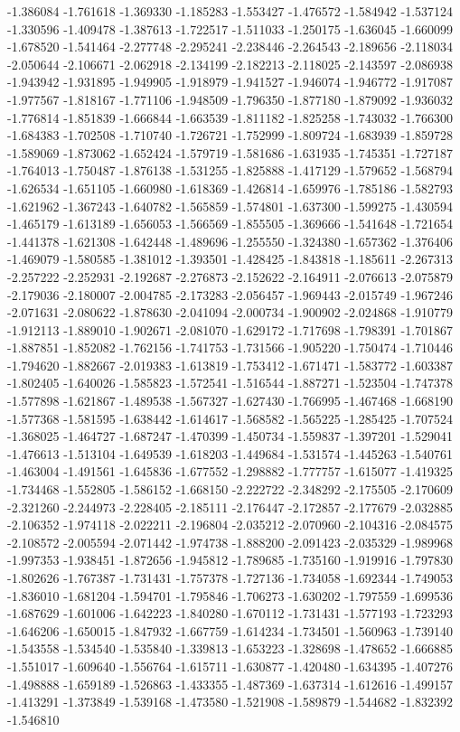 -1.386084
-1.761618
-1.369330
-1.185283
-1.553427
-1.476572
-1.584942
-1.537124
-1.330596
-1.409478
-1.387613
-1.722517
-1.511033
-1.250175
-1.636045
-1.660099
-1.678520
-1.541464
-2.277748
-2.295241
-2.238446
-2.264543
-2.189656
-2.118034
-2.050644
-2.106671
-2.062918
-2.134199
-2.182213
-2.118025
-2.143597
-2.086938
-1.943942
-1.931895
-1.949905
-1.918979
-1.941527
-1.946074
-1.946772
-1.917087
-1.977567
-1.818167
-1.771106
-1.948509
-1.796350
-1.877180
-1.879092
-1.936032
-1.776814
-1.851839
-1.666844
-1.663539
-1.811182
-1.825258
-1.743032
-1.766300
-1.684383
-1.702508
-1.710740
-1.726721
-1.752999
-1.809724
-1.683939
-1.859728
-1.589069
-1.873062
-1.652424
-1.579719
-1.581686
-1.631935
-1.745351
-1.727187
-1.764013
-1.750487
-1.876138
-1.531255
-1.825888
-1.417129
-1.579652
-1.568794
-1.626534
-1.651105
-1.660980
-1.618369
-1.426814
-1.659976
-1.785186
-1.582793
-1.621962
-1.367243
-1.640782
-1.565859
-1.574801
-1.637300
-1.599275
-1.430594
-1.465179
-1.613189
-1.656053
-1.566569
-1.855505
-1.369666
-1.541648
-1.721654
-1.441378
-1.621308
-1.642448
-1.489696
-1.255550
-1.324380
-1.657362
-1.376406
-1.469079
-1.580585
-1.381012
-1.393501
-1.428425
-1.843818
-1.185611
-2.267313
-2.257222
-2.252931
-2.192687
-2.276873
-2.152622
-2.164911
-2.076613
-2.075879
-2.179036
-2.180007
-2.004785
-2.173283
-2.056457
-1.969443
-2.015749
-1.967246
-2.071631
-2.080622
-1.878630
-2.041094
-2.000734
-1.900902
-2.024868
-1.910779
-1.912113
-1.889010
-1.902671
-2.081070
-1.629172
-1.717698
-1.798391
-1.701867
-1.887851
-1.852082
-1.762156
-1.741753
-1.731566
-1.905220
-1.750474
-1.710446
-1.794620
-1.882667
-2.019383
-1.613819
-1.753412
-1.671471
-1.583772
-1.603387
-1.802405
-1.640026
-1.585823
-1.572541
-1.516544
-1.887271
-1.523504
-1.747378
-1.577898
-1.621867
-1.489538
-1.567327
-1.627430
-1.766995
-1.467468
-1.668190
-1.577368
-1.581595
-1.638442
-1.614617
-1.568582
-1.565225
-1.285425
-1.707524
-1.368025
-1.464727
-1.687247
-1.470399
-1.450734
-1.559837
-1.397201
-1.529041
-1.476613
-1.513104
-1.649539
-1.618203
-1.449684
-1.531574
-1.445263
-1.540761
-1.463004
-1.491561
-1.645836
-1.677552
-1.298882
-1.777757
-1.615077
-1.419325
-1.734468
-1.552805
-1.586152
-1.668150
-2.222722
-2.348292
-2.175505
-2.170609
-2.321260
-2.244973
-2.228405
-2.185111
-2.176447
-2.172857
-2.177679
-2.032885
-2.106352
-1.974118
-2.022211
-2.196804
-2.035212
-2.070960
-2.104316
-2.084575
-2.108572
-2.005594
-2.071442
-1.974738
-1.888200
-2.091423
-2.035329
-1.989968
-1.997353
-1.938451
-1.872656
-1.945812
-1.789685
-1.735160
-1.919916
-1.797830
-1.802626
-1.767387
-1.731431
-1.757378
-1.727136
-1.734058
-1.692344
-1.749053
-1.836010
-1.681204
-1.594701
-1.795846
-1.706273
-1.630202
-1.797559
-1.699536
-1.687629
-1.601006
-1.642223
-1.840280
-1.670112
-1.731431
-1.577193
-1.723293
-1.646206
-1.650015
-1.847932
-1.667759
-1.614234
-1.734501
-1.560963
-1.739140
-1.543558
-1.534540
-1.535840
-1.339813
-1.653223
-1.328698
-1.478652
-1.666885
-1.551017
-1.609640
-1.556764
-1.615711
-1.630877
-1.420480
-1.634395
-1.407276
-1.498888
-1.659189
-1.526863
-1.433355
-1.487369
-1.637314
-1.612616
-1.499157
-1.413291
-1.373849
-1.539168
-1.473580
-1.521908
-1.589879
-1.544682
-1.832392
-1.546810
